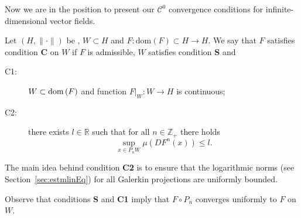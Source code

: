 Now we are in the position to present our $\mathcal C^0$ convergence conditions for infinite-dimensional vector fields.
\begin{definition}
Let $(H,\|\cdot\|)$ be \gss,  $W\subset H$ and $F:\mathrm{dom}(F)\subset H \to H$. We say that $F$ satisfies condition \textbf{C} on $W$ if $F$ is admissible, $W$ satisfies condition \textbf{S} and
\begin{description}
\item[C1:] $W \subset {\rm dom}\,(F)$ and function $F|_W:W \to H$ is continuous;
\item[C2:] there exists  $l \in \mathbb{R}$ such that for all $n\in\mathbb Z_+$ there holds
\begin{equation*}
	\sup_{x \in P_n W}\mu\left(D F^n (x) \right) \leq l.
\end{equation*}
\end{description}
\end{definition}
The main idea behind condition \textbf{C2} is to ensure that the logarithmic norms (see Section~\ref{sec:estmlinEq}) for all Galerkin projections are uniformly bounded.

Observe that conditions \textbf{S} and \textbf{C1} imply that $F \circ P_n$ converges uniformly to $F$ on $W$.



